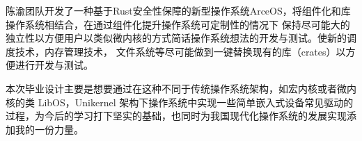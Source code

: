 
    陈渝团队开发了一种基于Rust安全性保障的新型操作系统ArceOS，将组件化和库操作系统相结合，在通过组件化提升操作系统可定制性的情况下
    保持尽可能大的独立性以方便用户以类似微内核的方式简话操作系统想法的开发与测试。使新的调度技术，内存管理技术，
    文件系统等尽可能做到一键替换现有的库（crates）以方便进行开发与测试。

    本次毕业设计主要是想要通过在这种不同于传统操作系统架构，如宏内核或者微内核的类 LibOS，Unikernel 架构下操作系统中实现一些简单嵌入式设备常见驱动的过程，为今后的学习打下坚实的基础，也同时为我国现代化操作系统的发展实现添加我的一份力量。





